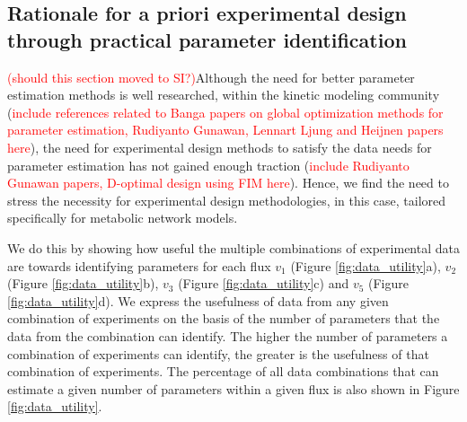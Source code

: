 \documentclass[10pt]{article}
\begin{document}
	
	\subsection{Rationale for a priori experimental design through practical parameter identification}\label{sec:data_utility}
	\textcolor{red}{(should this section moved to SI?)}Although the need for better parameter estimation methods is well researched, within the kinetic modeling community (\textcolor{red}{include references related to Banga papers on global optimization methods for parameter estimation, Rudiyanto Gunawan, Lennart Ljung and Heijnen papers here}), the need for experimental design methods to satisfy the data needs for parameter estimation has not gained enough traction (\textcolor{red}{include Rudiyanto Gunawan papers, D-optimal design using FIM here}). Hence, we find the need to stress the necessity for experimental design methodologies, in this case, tailored specifically for metabolic network models. 	
	
	We do this by showing how useful the multiple combinations of experimental data are towards identifying parameters for each flux $v_1$ (Figure \ref{fig:data_utility}a), $v_2$ (Figure \ref{fig:data_utility}b), $v_3$ (Figure \ref{fig:data_utility}c) and $v_5$ (Figure \ref{fig:data_utility}d). We express the usefulness of data from any given combination of experiments on the basis of the number of parameters that the data from the combination can identify. The higher the number of parameters a combination of experiments can identify, the greater is the usefulness of that combination of experiments. The percentage of all data combinations that can estimate a given number of parameters within a given flux is also shown in Figure \ref{fig:data_utility}.
	
\end{document}
